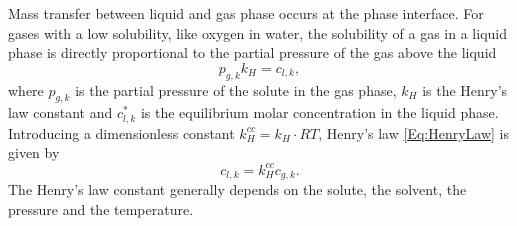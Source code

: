 \documentclass[a4paper,12pt]{article}
\newcommand{\kh}{\mbox{$k_H\xspace$}}
\newcommand{\khcc}{\mbox{$k_{H}^{cc}\xspace$}}
\newcommand{\pgk}{\mbox{$p_{g,k}$}}
\newcommand{\cak}{\mbox{$c^*_{l,k}$}}
\newcommand{\cake}{\mbox{$c_{l,k}$}}
\newcommand{\cgke}{\mbox{$c_{g,k}$}}
\begin{document}
Mass transfer between liquid and gas phase occurs at the phase
interface. For gases with a low solubility, like oxygen in water, the
solubility of a gas in a liquid phase is directly proportional to the
partial pressure of the gas above the liquid
\begin{equation} \pgk \kh = \cake, \label{Eq:HenryLaw}
\end{equation} where $\pgk$ is the partial pressure of the solute in
the gas phase, $\kh$ is the Henry's law constant and $\cak$ is the
equilibrium molar concentration in the liquid phase. Introducing a
dimensionless constant $\khcc=\kh \cdot RT$, Henry's law
\eqref{Eq:HenryLaw} is given by \cite{Sander1999}
\begin{equation} \cake = \khcc \cgke.  \label{Eq:HenryLaw2}
\end{equation} The Henry's law constant generally depends on the
solute, the solvent, the pressure and the temperature.
\end{document}

